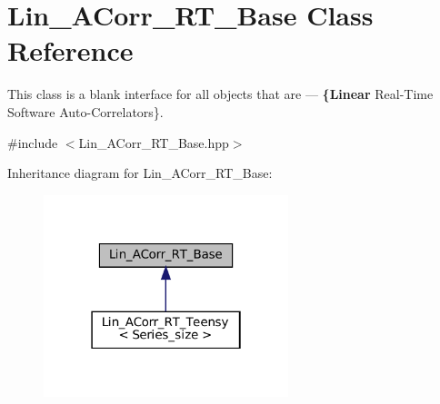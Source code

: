 \hypertarget{classLin__ACorr__RT__Base}{}\section{Lin\+\_\+\+A\+Corr\+\_\+\+R\+T\+\_\+\+Base Class Reference}
\label{classLin__ACorr__RT__Base}


This class is a blank interface for all objects that are — {\bfseries \{Linear} Real-\/\+Time Software Auto-\/\+Correlators\}.  




{\ttfamily \#include $<$Lin\+\_\+\+A\+Corr\+\_\+\+R\+T\+\_\+\+Base.\+hpp$>$}



Inheritance diagram for Lin\+\_\+\+A\+Corr\+\_\+\+R\+T\+\_\+\+Base\+:\nopagebreak
\begin{figure}[H]
\begin{center}
\leavevmode
\includegraphics[width=202pt]{classLin__ACorr__RT__Base__inherit__graph}
\end{center}
\end{figure}
